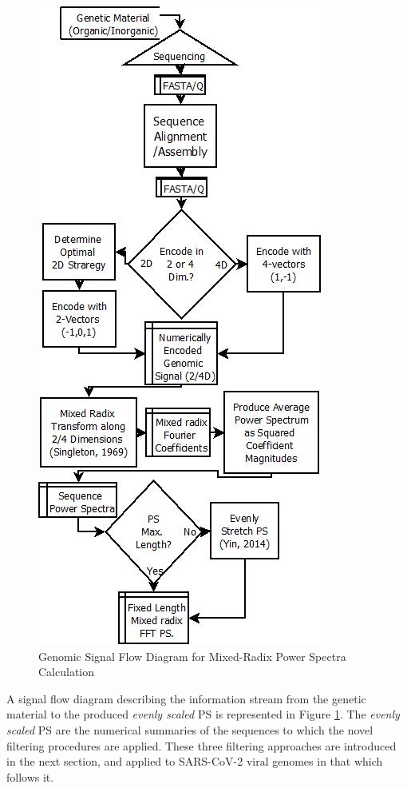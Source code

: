 \documentclass[10pt,conference]{IEEEtran}
\begin{document}
\vspace{-1 em}
\begin{figure}[h!]
\caption{Genomic Signal Flow Diagram for Mixed-Radix Power Spectra Calculation} 
\label{fig:fftflow} 
\begin{center} 
\includegraphics[scale=0.6]{Images/Files/GenomicFFTSignalFlow.png}
\end{center} 
\end{figure} 
\vspace{-1 em} 

A signal flow diagram describing the information stream from the genetic material to the produced \textit{evenly scaled} PS is represented in Figure \ref{fig:fftflow}.  
The \textit{evenly scaled} PS are the numerical summaries of the sequences to which 
the novel filtering procedures are applied.
These three filtering approaches are introduced in the next section, and applied to SARS-CoV-2 viral genomes in that which follows it. 
\end{document}
